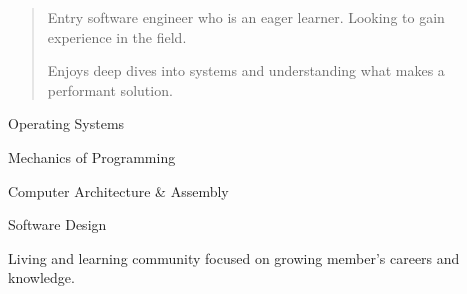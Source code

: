   \begin{quote}
    Entry software engineer who is an eager learner. Looking to gain experience in the field. \par
    Enjoys deep dives into systems and understanding what makes a performant solution.
  \end{quote}


  \smallskip{}

  \smallskip{}
  \cvtag{\LaTeX}
  
  Operating Systems \par
  Mechanics of Programming \par
  Computer Architecture \& Assembly \par
  Software Design


  Living and learning community focused on growing member's careers and knowledge.

